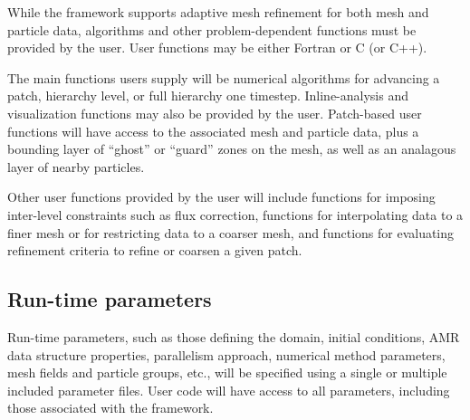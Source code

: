 \documentclass{article}
\begin{document}
While the framework supports adaptive mesh refinement for both mesh
and particle data, algorithms and other problem-dependent functions
must be provided by the user.  User functions may be either Fortran or
C (or C++).  

The main functions users supply will be numerical algorithms for
advancing a patch, hierarchy level, or full hierarchy one timestep.
Inline-analysis and visualization functions may also be provided by
the user.  Patch-based user functions will have access to the
associated mesh and particle data, plus a bounding layer of ``ghost''
or ``guard'' zones on the mesh, as well as an analagous layer of
nearby particles.

Other user functions provided by the user will include functions for
imposing inter-level constraints such as flux correction, functions
for interpolating data to a finer mesh or for restricting data to a
coarser mesh, and functions for evaluating refinement criteria to
refine or coarsen a given patch.



\subsection{Run-time parameters}

Run-time parameters, such as those defining the domain, initial
conditions, AMR data structure properties, parallelism approach,
numerical method parameters, mesh fields and particle groups, etc.,
will be specified using a single or multiple included parameter files.
User code will have access to all parameters, including those
associated with the framework.
\end{document}
